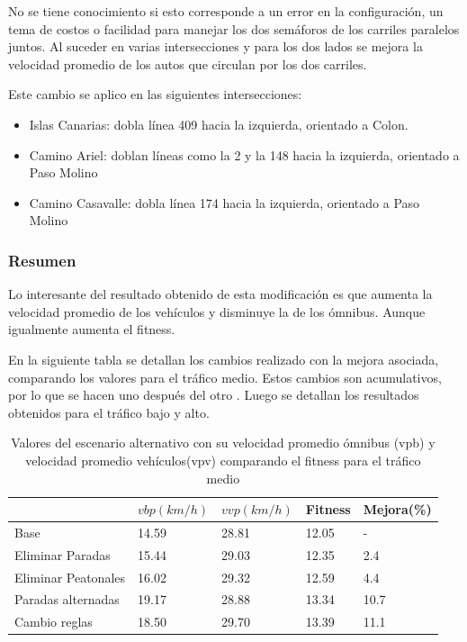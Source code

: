 No se tiene conocimiento si esto corresponde a un error en la configuración, un tema de costos o facilidad para manejar los dos semáforos de los carriles paralelos juntos. Al suceder en varias intersecciones y para los dos lados se mejora la velocidad promedio de los autos que circulan por los dos carriles.

Este cambio se aplico en las siguientes intersecciones:
\begin{itemize}
	\item Islas Canarias: dobla línea 409 hacia la izquierda, orientado a Colon.
	\item Camino Ariel: doblan líneas como la  2 y la 148 hacia la izquierda, orientado a Paso Molino 
	\item Camino Casavalle: dobla línea 174 hacia la izquierda, orientado a Paso Molino 
\end{itemize}

\subsubsection{Resumen}
Lo interesante del resultado obtenido de esta modificación es que aumenta la velocidad promedio de los vehículos y disminuye la de los ómnibus. Aunque igualmente aumenta el fitness. 

En la siguiente tabla se detallan los cambios realizado con la mejora asociada, comparando los valores para el tráfico medio. Estos cambios son acumulativos, por lo que se hacen uno después del otro . Luego se detallan los resultados obtenidos para el tráfico bajo y alto.


\begin{table}[H]
	\renewcommand{\arraystretch}{1.2}
	\caption{Valores del escenario alternativo con su velocidad promedio ómnibus (vpb) y velocidad promedio vehículos(vpv) comparando el fitness para el tráfico medio }
	\label{table:resultado_alternativo}
	\centering
	\begin{tabular}{p{3.5cm}p{2.5cm}p{2.5cm}p{2cm}p{2cm} }
		\hline
		&
		$vbp(km/h)$& 
		$vvp(km/h)$ & 
		Fitness &
		Mejora(\%)
		\\ 
		\hline
		Base & 14.59  & 28.81& 12.05 & -\\
		Eliminar Paradas & 15.44  & 29.03& 12.35 & 2.4\\
		Eliminar Peatonales  & 16.02  & 29.32& 12.59 & 4.4\\
		Paradas alternadas  & 19.17  & 28.88& 13.34 & 10.7\\	
		Cambio reglas  & 18.50  & 29.70& 13.39 & 11.1\\				
		\hline
	\end{tabular}
\end{table}





